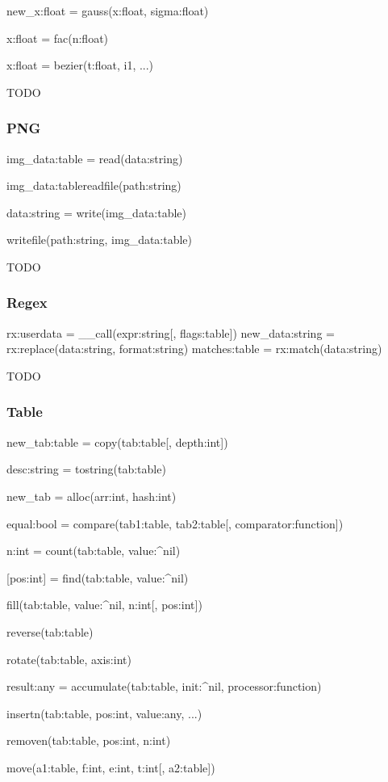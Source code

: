 new_x:float = gauss(x:float, sigma:float)

x:float = fac(n:float)

x:float = bezier(t:float, i1, ...)

TODO

\subsubsection{PNG}
\label{sec:png}

img_data:table = read(data:string)

img_data:tablereadfile(path:string)

data:string = write(img_data:table)

writefile(path:string, img_data:table)

TODO

\subsubsection{Regex}
\label{sec:regex}

rx:userdata = __call(expr:string[, flags:table])
new_data:string = rx:replace(data:string, format:string)
matches:table = rx:match(data:string)

TODO

\subsubsection{Table}
\label{sec:table}

new_tab:table = copy(tab:table[, depth:int])

desc:string = tostring(tab:table)

new_tab = alloc(arr:int, hash:int)

equal:bool = compare(tab1:table, tab2:table[, comparator:function])

n:int = count(tab:table, value:^nil)

[pos:int] = find(tab:table, value:^nil)

fill(tab:table, value:^nil, n:int[, pos:int])

reverse(tab:table)

rotate(tab:table, axis:int)

result:any = accumulate(tab:table, init:^nil, processor:function)

insertn(tab:table, pos:int, value:any, ...)

removen(tab:table, pos:int, n:int)

move(a1:table, f:int, e:int, t:int[, a2:table])

